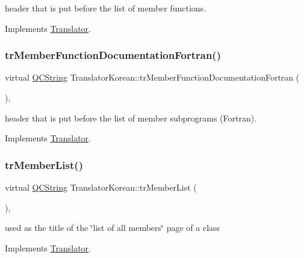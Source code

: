 header that is put before the list of member functions. 

Implements \mbox{\hyperlink{class_translator}{Translator}}.

\mbox{\label{class_translator_korean_af7a255882ab03e122e2dd6d5b1f7223b}} 
\subsubsection{\texorpdfstring{trMemberFunctionDocumentationFortran()}{trMemberFunctionDocumentationFortran()}}
{\footnotesize\ttfamily virtual \mbox{\hyperlink{class_q_c_string}{Q\+C\+String}} Translator\+Korean\+::tr\+Member\+Function\+Documentation\+Fortran (\begin{DoxyParamCaption}{ }\end{DoxyParamCaption})\hspace{0.3cm}{\ttfamily [inline]}, {\ttfamily [virtual]}}

header that is put before the list of member subprograms (Fortran). 

Implements \mbox{\hyperlink{class_translator}{Translator}}.

\mbox{\label{class_translator_korean_a80596b4faca0782e31636dd410eeeaa1}} 
\subsubsection{\texorpdfstring{trMemberList()}{trMemberList()}}
{\footnotesize\ttfamily virtual \mbox{\hyperlink{class_q_c_string}{Q\+C\+String}} Translator\+Korean\+::tr\+Member\+List (\begin{DoxyParamCaption}{ }\end{DoxyParamCaption})\hspace{0.3cm}{\ttfamily [inline]}, {\ttfamily [virtual]}}

used as the title of the \char`\"{}list of all members\char`\"{} page of a class 

Implements \mbox{\hyperlink{class_translator}{Translator}}.

